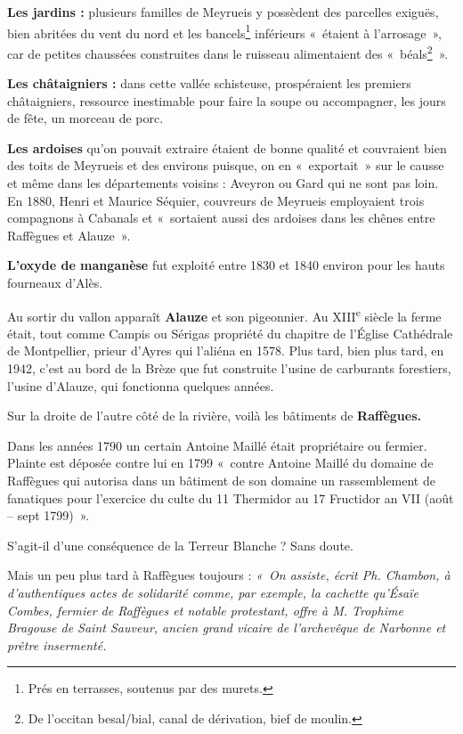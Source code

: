 \textbf{Les jardins :} plusieurs familles de Meyrueis y possèdent des parcelles exiguës, bien abritées
du vent du nord et les bancels\footnote{Prés en terrasses, soutenus par des murets.} inférieurs «~étaient à l’arrosage~», car de petites chaussées construites dans le ruisseau alimentaient des «~béals\footnote{De l’occitan besal/bial, canal de dérivation, bief de moulin.}~».

\textbf{Les châtaigniers :} dans cette vallée schisteuse, prospéraient les premiers châtaigniers,
ressource inestimable pour faire la soupe ou accompagner, les jours de fête, un morceau de
porc.

\textbf{Les ardoises} qu’on pouvait extraire étaient de bonne qualité et couvraient bien des toits de
Meyrueis et des environs puisque, on en «~exportait~» sur le causse et même dans les
départements voisins : Aveyron ou Gard qui ne sont pas loin. En 1880, Henri et Maurice
Séquier, couvreurs de Meyrueis employaient trois compagnons à Cabanals et «~sortaient aussi
des ardoises dans les chênes entre Raffègues et Alauze~».

\textbf{L’oxyde de manganèse} fut exploité entre 1830 et 1840 environ pour les hauts fourneaux
d’Alès.

Au sortir du vallon apparaît \textbf{Alauze} et son pigeonnier. Au XIII\textsuperscript{e} siècle la ferme était, tout
comme Campis ou Sérigas propriété du chapitre de l’Église Cathédrale de Montpellier, prieur
d’Ayres qui l’aliéna en 1578. Plus tard, bien plus tard, en 1942, c’est au bord de la Brèze que
fut construite l’usine de carburants forestiers, l’usine d’Alauze, qui fonctionna quelques
années.

Sur la droite de l’autre côté de la rivière, voilà les bâtiments de \textbf{Raffègues.}

Dans les années 1790 un certain Antoine Maillé était propriétaire ou fermier. Plainte est
déposée contre lui en 1799 «~contre Antoine Maillé du domaine de Raffègues qui autorisa
dans un bâtiment de son domaine un rassemblement de fanatiques pour l’exercice du culte du 11 Thermidor au 17 Fructidor an VII (août -- sept 1799)~».

S’agit-il d’une conséquence de la Terreur Blanche ? Sans doute.

Mais un peu plus tard à Raffègues toujours : \textit{«~On assiste, écrit Ph. Chambon, à d’authentiques
actes de solidarité comme, par exemple, la cachette qu’Ésaïe Combes, fermier de Raffègues et
notable protestant, offre à M. Trophime Bragouse de Saint Sauveur, ancien grand vicaire de
l’archevêque de Narbonne et prêtre insermenté.}

